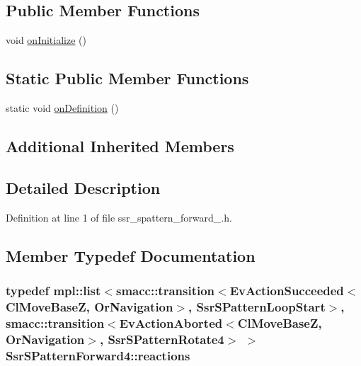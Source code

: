 \subsection*{Public Member Functions}
\begin{DoxyCompactItemize}
\item 
void \hyperlink{structSsrSPatternForward4_ad0ad8bfc383496145a5e535031286f73}{on\+Initialize} ()
\end{DoxyCompactItemize}
\subsection*{Static Public Member Functions}
\begin{DoxyCompactItemize}
\item 
static void \hyperlink{structSsrSPatternForward4_a6d79c39c58f9838e0d15ef954f7678ff}{on\+Definition} ()
\end{DoxyCompactItemize}
\subsection*{Additional Inherited Members}


\subsection{Detailed Description}


Definition at line 1 of file ssr\+\_\+spattern\+\_\+forward\+\_.\+h.



\subsection{Member Typedef Documentation}
\subsubsection[{\texorpdfstring{reactions}{reactions}}]{\setlength{\rightskip}{0pt plus 5cm}typedef mpl\+::list$<${\bf smacc\+::transition}$<$Ev\+Action\+Succeeded$<$Cl\+Move\+BaseZ, Or\+Navigation$>$, {\bf Ssr\+S\+Pattern\+Loop\+Start}$>$, {\bf smacc\+::transition}$<$Ev\+Action\+Aborted$<$Cl\+Move\+BaseZ, Or\+Navigation$>$, {\bf Ssr\+S\+Pattern\+Rotate4}$>$ $>$ {\bf Ssr\+S\+Pattern\+Forward4\+::reactions}}\hypertarget{structSsrSPatternForward4_ab96215cb7af7a9dfe1dfad6a1f4979d5}{}\label{structSsrSPatternForward4_ab96215cb7af7a9dfe1dfad6a1f4979d5}


